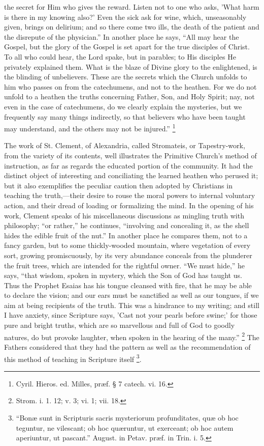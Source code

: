 the secret for Him who gives the reward. Listen not to one who asks,
'What harm is there in my knowing also?' Even the sick ask for wine,
which, unseasonably given, brings on delirium; and so there come two
ills, the death of the patient and the disrepute of the
physician.'' In another place he says, ``All may hear the
Gospel, but the glory of the Gospel is set apart for the true
disciples of Christ. To all who could hear, the Lord spake, but in
parables; to His disciples He privately explained them. What is the
blaze of Divine glory to the enlightened, is the blinding of
unbelievers. These are the secrets which the Church unfolds to him who
passes on from the catechumens, and not to the heathen. For we do not
unfold to a heathen the truths concerning Father, Son, and Holy
Spirit; nay, not even in the case of catechumens, do we clearly
explain the mysteries, but we frequently say many things indirectly,
so that believers who have been taught may understand, and the others
may not be injured.'' \footnote{Cyril. Hieros. ed. Milles, præf. § 7
catech. vi. 16.}

The work of St. Clement, of Alexandria, called Stromateis, or
Tapestry-work, from the variety of its contents, well illustrates the
Primitive Church's method of instruction, as far as regards the
educated portion of the community. It had the distinct object of
interesting and conciliating the learned heathen who perused it;
but it also exemplifies the peculiar caution then adopted by
Christians in teaching the truth,—their desire to rouse the moral
powers to internal voluntary action, and their dread of loading or
formalizing the mind. In the opening of his work, Clement speaks of
his miscellaneous discussions as mingling truth with philosophy;
``or rather,'' he continues, ``involving and concealing
it, as the shell hides the edible fruit of the nut.'' In another
place he compares them, not to a fancy garden, but to some
thickly-wooded mountain, where vegetation of every sort, growing
promiscuously, by its very abundance conceals from the plunderer the
fruit trees, which are intended for the rightful owner. ``We must
hide,'' he says, ``that wisdom, spoken in mystery, which the
Son of God has taught us. Thus the Prophet Esaias has his tongue
cleansed with fire, that he may be able to declare the vision; and our
ears must be sanctified as well as our tongues, if we aim at being
recipients of the truth. This was a hindrance to my writing; and still
I have anxiety, since Scripture says, 'Cast not your pearls before
swine;' for those pure and bright truths, which are so marvellous and
full of God to goodly natures, do but provoke laughter, when spoken in
the hearing of the many.'' \footnote{Strom. i. 1. 12; v. 3; vi. 1; vii. 18.} The Fathers considered that they had the pattern as well as
the recommendation of this method of teaching in Scripture itself \footnote{``Bonæ sunt in Scripturis sacris
mysteriorum profunditates, quæ ob hoc teguntur, ne vilescant; ob hoc
quæruntur, ut exerceant; ob hoc autem aperiuntur, ut pascant.''
August. in Petav. præf. in Trin. i. 5.}.

